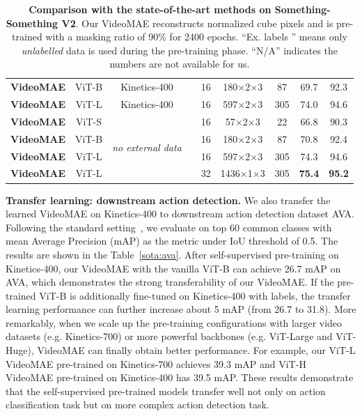 \documentclass{article}
\newcommand{\xmark}{\ding{55}}%
\def\x{$\times$}
\begin{document}
\begin{table}[t!]
\begin{tabular}{l|c|c|c|c|c|c|c|c}
\hline
\textbf{VideoMAE} & ViT-B &  Kinetics-400 & \xmark & 16 & 180\x2\x3 & 87 & 69.7 &  92.3 \\
\textbf{VideoMAE} & ViT-L & Kinetics-400 & \xmark & 16 & 597\x2\x3 & 305 & 74.0 & 94.6 \\
\shline\hline
\textbf{VideoMAE} & ViT-S & \multirow{4}{*}{\emph{no external data}} & \xmark & 16 & 57\x2\x3 & 22 & 66.8 & 90.3 \\
\textbf{VideoMAE} & ViT-B &  & \xmark & 16 & 180\x2\x3 & 87 & 70.8 & 92.4 \\
\textbf{VideoMAE} & ViT-L &  & \xmark & 16 & 597\x2\x3 & 305 & 74.3 & 94.6 \\
\textbf{VideoMAE} & ViT-L &  & \xmark & 32 & 1436\x1\x3 & 305 & \textbf{75.4} & \textbf{95.2} \\
\end{tabular}
\vspace{-2mm}
\caption{\textbf{Comparison with the state-of-the-art methods on Something-Something V2}. Our VideoMAE reconstructs normalized cube pixels and is pre-trained with a masking ratio of 90\% for 2400 epochs. ``Ex. labels \xmark '' means only \textit{unlabelled} data is used during the pre-training phase. ``N/A'' indicates the numbers are not available for us.}
\label{tab:ssv2}
\vspace{-3.8mm}
\end{table}


{\flushleft \bf Transfer learning: downstream action detection.}
We also transfer the learned VideoMAE on Kinetics-400 to downstream action detection dataset AVA. Following the standard setting~\cite{ava}, we evaluate on top 60 common classes with mean Average Precision (mAP) as the metric under IoU threshold of 0.5. The results are shown in the Table~\ref{sota:ava}. After self-supervised pre-training on Kinetics-400, our VideoMAE with the vanilla ViT-B can achieve 26.7 mAP on AVA, which demonstrates the strong transferability of our VideoMAE. If the pre-trained ViT-B is additionally fine-tuned on Kinetics-400 with labels, the transfer learning performance can further increase about 5 mAP (from 26.7 to 31.8). 
More remarkably, when we scale up the pre-training configurations with larger video datasets (e.g. Kinetics-700) or more powerful backbones (e.g. ViT-Large and ViT-Huge), VideoMAE can finally obtain better performance.
For example, our ViT-L VideoMAE pre-trained on Kinetics-700 achieves 39.3 mAP and ViT-H VideoMAE pre-trained on Kinetics-400 has 39.5 mAP.
These results demonstrate that the self-supervised pre-trained models transfer well not only on action classification task but on more complex action detection task.
\end{document}
